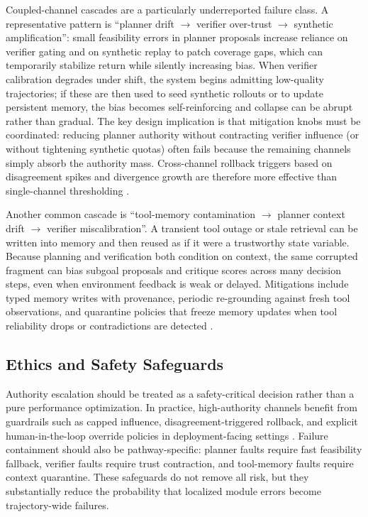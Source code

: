 ﻿\documentclass[conference]{IEEEtran}
\begin{document}
Coupled-channel cascades are a particularly underreported failure class. A representative pattern is ``planner drift $\rightarrow$ verifier over-trust $\rightarrow$ synthetic amplification'': small feasibility errors in planner proposals increase reliance on verifier gating and on synthetic replay to patch coverage gaps, which can temporarily stabilize return while silently increasing bias. When verifier calibration degrades under shift, the system begins admitting low-quality trajectories; if these are then used to seed synthetic rollouts or to update persistent memory, the bias becomes self-reinforcing and collapse can be abrupt rather than gradual. The key design implication is that mitigation knobs must be coordinated: reducing planner authority without contracting verifier influence (or without tightening synthetic quotas) often fails because the remaining channels simply absorb the authority mass. Cross-channel rollback triggers based on disagreement spikes and divergence growth are therefore more effective than single-channel thresholding \cite{arxiv_p_2204_01691,arxiv_p_2405_01534,arxiv_p_2602_06493,arxiv_p_2602_12579,arxiv_p_2602_02454,arxiv_p_2404_03648}.

Another common cascade is ``tool-memory contamination $\rightarrow$ planner context drift $\rightarrow$ verifier miscalibration''. A transient tool outage or stale retrieval can be written into memory and then reused as if it were a trustworthy state variable. Because planning and verification both condition on context, the same corrupted fragment can bias subgoal proposals and critique scores across many decision steps, even when environment feedback is weak or delayed. Mitigations include typed memory writes with provenance, periodic re-grounding against fresh tool observations, and quarantine policies that freeze memory updates when tool reliability drops or contradictions are detected \cite{arxiv_p_2404_03648,arxiv_p_2602_00994,arxiv_p_2601_07264,arxiv_p_2601_02439,arxiv_p_2602_06493}.

\subsection*{Ethics and Safety Safeguards}
Authority escalation should be treated as a safety-critical decision rather than a pure performance optimization. In practice, high-authority channels benefit from guardrails such as capped influence, disagreement-triggered rollback, and explicit human-in-the-loop override policies in deployment-facing settings \cite{arxiv_p_2512_05686,arxiv_p_2602_09367,arxiv_p_2602_13156}. Failure containment should also be pathway-specific: planner faults require fast feasibility fallback, verifier faults require trust contraction, and tool-memory faults require context quarantine. These safeguards do not remove all risk, but they substantially reduce the probability that localized module errors become trajectory-wide failures.
\end{document}

